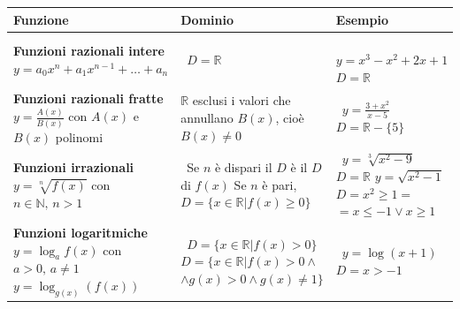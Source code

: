 \begin{table}

\raggedleft
  \begin{tabularx}{1,2\textwidth}{XXX}
  \toprule
  Funzione & Dominio  & Esempio \\
  \midrule
  
  \textbf{Funzioni razionali intere} 
\newline$y=a_0x^n+a_1x^{n-1}+\dots+a_n$ 
  & $\,$ \newline $D=\mathbb{R}$ 
  & $\,$ \newline $y=x^3-x^2+2x+1$ \newline $D=\mathbb{R}$ \\
  \midrule

  \textbf{Funzioni razionali fratte} \newline 
$y=\frac{A(x)}{B(x)}$ \newline con $A(x)$ e $B(x)$ polinomi 
  & $\mathbb{R}$ esclusi i valori che annullano $B(x)$, cioè 
\newline $B(x)\neq 0$
  & $\,$ \newline$y=\frac{3+x^2}{x-5}$\newline $D= 
\mathbb{R}-\{5\}$ \\
  \midrule

  \textbf{Funzioni irrazionali} \newline $y=\sqrt[n]{f(x)}$ 
\newline con $n\in\mathbb{N},\,n>1$ 
  & $\,$ \newline Se $n$ è dispari il $D$ è il $D$ di $f(x)$ 
\newline \newline Se $n$ è pari, \newline$D=\{x\in\mathbb{R}\vert f(x)\geq0\}$
  & $\,$ \newline $y=\sqrt[3]{x^2-9}$\newline $D=\mathbb{R}$ 
\newline \newline $y=\sqrt{x^2-1}$\newline $D=x^2\geq1=$\newline 
$=x\leq-1\lor x\geq1$ \\
  \midrule
  
  \textbf{Funzioni logaritmiche} \newline $y=\log_af(x)$ 
\newline con $a>0,\,a\neq1$ \newline \newline $y=\log_{g(x)}(f(x))$ 
  & $\,$ \newline $D=\{x\in\mathbb{R}\vert f(x)>0\}$\newline 
\newline \newline$D=\{x\in\mathbb{R}\vert f(x)>0\land$\newline$\land 
g(x)>0\land g(x)\neq1\}$
  & $\,$ \newline $y=\log(x+1)$\newline $D=x>-1$\\
  \midrule
  

\end{tabularx}
\end{table}
